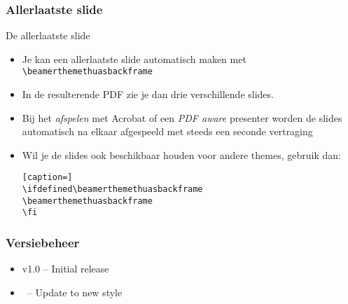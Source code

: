 \documentclass[fleqn,aspectratio=169,dutch,10pt]{beamer}
\begin{document}
\begin{frame}[fragile]
\frametitle{Allerlaatste slide}
De allerlaatste slide
\begin{itemize}
\item Je kan een allerlaatste slide automatisch maken met \lstinline|\beamerthemethuasbackframe|
\item In de resulterende PDF zie je dan drie verschillende slides.
\item Bij het \textsl{afspelen} met Acrobat of een \textsl{PDF aware} presenter worden de slides automatisch na elkaar afgespeeld met steeds een seconde vertraging
\item Wil je de slides ook beschikbaar houden voor andere themes, gebruik dan:
\begin{lstlisting}[caption=]
\ifdefined\beamerthemethuasbackframe
\beamerthemethuasbackframe
\fi
\end{lstlisting}
\end{itemize}
\end{frame}

\beamerthemethuasbackframe


\subtitle{Dit is een tweede titelslide}
\maketitle


\begin{frame}
\frametitle{Versiebeheer}
\begin{itemize}
\item v1.0 -- Initial release
\item \beamerthemethuasversion\ -- Update to new style
\end{itemize}
\end{frame}

%
%
%
%
\end{document}
